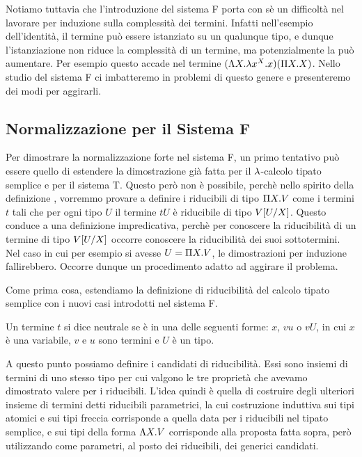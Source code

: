 \documentclass[]{marticle}
\begin{document}
Notiamo tuttavia che l'introduzione del sistema F porta con s\`e un difficolt\`a
nel lavorare per induzione sulla complessit\`a dei termini. Infatti nell'esempio
dell'identit\`a, il termine pu\`o essere istanziato su un qualunque tipo, e
dunque l'istanziazione non riduce la complessit\`a di un termine, ma
potenzialmente la pu\`o aumentare. Per esempio questo accade nel termine $(\L X.
\l x^X. x)(\P X. X)$. Nello studio del sistema F ci imbatteremo in problemi di
questo genere e presenteremo dei modi per aggirarli.

\subsection{Normalizzazione per il Sistema F}
Per dimostrare la normalizzazione forte nel sistema F, un primo tentativo pu\`o
essere quello di estendere la dimostrazione gi\`a fatta per il $\l$-calcolo
tipato semplice e per il sistema T. Questo per\`o non \`e possibile, perch\`e
nello spirito della definizione , vorremmo
provare a definire i riducibili di tipo $\P X. V$ come i termini $t$ tali che
per ogni tipo $U$ il termine $tU$ \`e riducibile di tipo $V\sub{U}{X}$. Questo
conduce a una definizione impredicativa, perch\`e per conoscere la
riducibilit\`a di un termine di tipo $V\sub{U}{X}$ occorre conoscere la
riducibilit\`a dei suoi sottotermini. Nel caso in cui per esempio si avesse $U =
\P X.V$, le dimostrazioni per induzione fallirebbero. Occorre dunque un
procedimento adatto ad aggirare il problema.

Come prima cosa, estendiamo la definizione di riducibilit\`a del calcolo tipato
semplice con i nuovi casi introdotti nel sistema F.
\begin{block}[Definizione]
    Un termine $t$ si dice neutrale se \`e in una delle seguenti forme: $x$,
    $vu$ o $vU$, in cui $x$ \`e una variabile, $v$ e $u$ sono termini e $U$ \`e
    un tipo.
\end{block}

A questo punto possiamo definire i candidati di riducibilit\`a. Essi sono
insiemi di termini di uno stesso tipo per cui valgono le tre propriet\`a che
avevamo dimostrato valere per i riducibili. L'idea quindi \`e quella di
costruire degli ulteriori insieme di termini detti riducibili parametrici, la
cui costruzione induttiva sui tipi atomici e sui tipi freccia corrisponde a
quella data per i riducibili nel tipato semplice, e sui tipi della forma $\L
X.V$ corrisponde alla proposta fatta sopra, per\`o utilizzando come parametri,
al posto dei riducibili, dei generici candidati.
\end{document}

